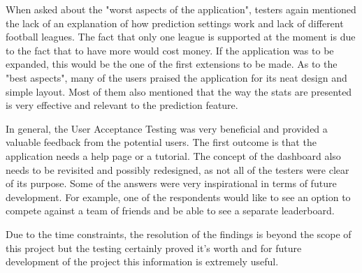 When asked about the "worst aspects of the application", testers again mentioned the lack of an explanation of how prediction settings work and lack of different football leagues. The fact that only one league is supported at the moment is due to the fact that to have more would cost money. If the application was to be expanded, this would be the one of the first extensions to be made. As to the "best aspects", many of the users praised the application for its neat design and simple layout. Most of them also mentioned that the way the stats are presented is very effective and relevant to the prediction feature.

In general, the User Acceptance Testing was very beneficial and provided a valuable feedback from the potential users. The first outcome is that the application needs a help page or a tutorial. The concept of the dashboard also needs to be revisited and possibly redesigned, as not all of the testers were clear of its purpose. Some of the answers were very inspirational in terms of future development. For example, one of the respondents would like to see an option to compete against a team of friends and be able to see a separate leaderboard.

Due to the time constraints, the resolution of the findings is beyond the scope of this project but the testing certainly proved it's worth and for future development of the project this information is extremely useful.
